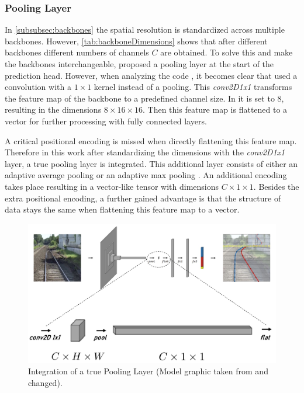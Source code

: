 \subsubsection{Pooling Layer}

In \autoref{subsubsec:backbones} the spatial resolution is standardized across multiple backbones.
However, \autoref{tab:backboneDimensions} shows that after different backbones different numbers of channels $C$ are obtained.
To solve this and make the backbones interchangeable, \cite{tepNet2024} proposed a pooling layer at the start of the prediction head.
However, when analyzing the code \cite{tepNet2024GitHub}, it becomes clear that \cite{tepNet2024} used a convolution with a $1 \times 1$ kernel instead of a pooling.
This \textit{conv2D1x1} transforms the feature map of the backbone to a predefined channel size.
In \cite{tepNet2024GitHub} it is set to 8, resulting in the dimensions $8 \times 16 \times 16$.
Then this feature map is flattened to a vector for further processing with fully connected layers.

A critical positional encoding is missed when directly flattening this feature map.
Therefore in this work after standardizing the dimensions with the \textit{conv2D1x1} layer, a true pooling layer is integrated.
This additional layer consists of either an adaptive average pooling \cite{pytorch_averagePool_docu} or an adaptive max pooling \cite{pytorch_maxPool_docu}.
An additional encoding takes place resulting in a vector-like tensor with dimensions $C \times 1 \times 1$.
Besides the extra positional encoding, a further gained advantage is that the structure of data stays the same when flattening this feature map to a vector.

\begin{figure}[H]
    \centering
    \includegraphics[width=0.75\linewidth]{PICs/improvedModel/poolingLayers.jpg}
    \caption{Integration of a true Pooling Layer (Model graphic taken from \cite{tepNet2024} and changed).}
    \label{fig:truePoolingLayer}
\end{figure}

